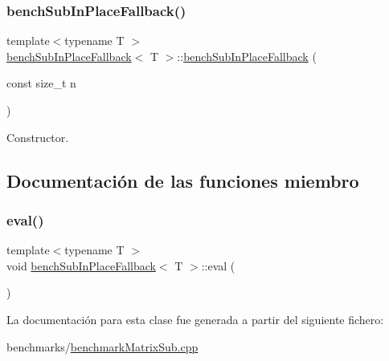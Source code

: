 \subsubsection{\texorpdfstring{bench\+Sub\+In\+Place\+Fallback()}{benchSubInPlaceFallback()}}
{\footnotesize\ttfamily template$<$typename T $>$ \\
\hyperlink{classbenchSubInPlaceFallback}{bench\+Sub\+In\+Place\+Fallback}$<$ T $>$\+::\hyperlink{classbenchSubInPlaceFallback}{bench\+Sub\+In\+Place\+Fallback} (\begin{DoxyParamCaption}\item[{const size\+\_\+t}]{n }\end{DoxyParamCaption})\hspace{0.3cm}{\ttfamily [inline]}}



Constructor. 



\subsection{Documentación de las funciones miembro}
\mbox{\label{classbenchSubInPlaceFallback_ad7b8c5b4ae82a1b93c5b89dda35079b8}} 
\subsubsection{\texorpdfstring{eval()}{eval()}}
{\footnotesize\ttfamily template$<$typename T $>$ \\
void \hyperlink{classbenchSubInPlaceFallback}{bench\+Sub\+In\+Place\+Fallback}$<$ T $>$\+::eval (\begin{DoxyParamCaption}{ }\end{DoxyParamCaption})\hspace{0.3cm}{\ttfamily [inline]}}



La documentación para esta clase fue generada a partir del siguiente fichero\+:\begin{DoxyCompactItemize}
\item 
benchmarks/\hyperlink{benchmarkMatrixSub_8cpp}{benchmark\+Matrix\+Sub.\+cpp}\end{DoxyCompactItemize}

